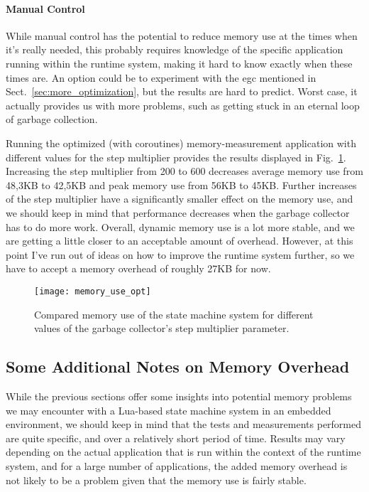 \paragraph{Manual Control} While manual control has the potential to reduce memory use at the times when it's really needed, this probably requires knowledge of the specific application running within the runtime system, making it hard to know exactly when these times are. An option could be to experiment with the \gls{egc} mentioned in Sect.~\ref{sec:more_optimization}, but the results are hard to predict. Worst case, it actually provides us with more problems, such as getting stuck in an eternal loop of garbage collection.

Running the optimized (with coroutines) memory-measurement application with different values for the step multiplier provides the results displayed in Fig.~\ref{fig:memory_use_opt}. Increasing the step multiplier from 200 to 600 decreases average memory use from 48,3KB to 42,5KB and peak memory use from 56KB to 45KB. Further increases of the step multiplier have a significantly smaller effect on the memory use, and we should keep in mind that performance decreases when the garbage collector has to do more work. Overall, dynamic memory use is a lot more stable, and we are getting a little closer to an acceptable amount of overhead. However, at this point I've run out of ideas on how to improve the runtime system further, so we have to accept a memory overhead of roughly 27KB for now.

\begin{figure}[htp]
	\centering
	\texttt{[image: memory\_use\_opt]}
	\caption[Results of tinkering with the garbage collector for the state machine application]{Compared memory use of the state machine system for different values of the garbage collector's step multiplier parameter.}
	\label{fig:memory_use_opt}
\end{figure}

\subsection{Some Additional Notes on Memory Overhead}
\label{sec:mem_overhead_notes}
While the previous sections offer some insights into potential memory problems we may encounter with a Lua-based state machine system in an embedded environment, we should keep in mind that the tests and measurements performed are quite specific, and over a relatively short period of time. Results may vary depending on the actual application that is run within the context of the runtime system, and for a large number of applications, the added memory overhead is not likely to be a problem given that the memory use is fairly stable.


